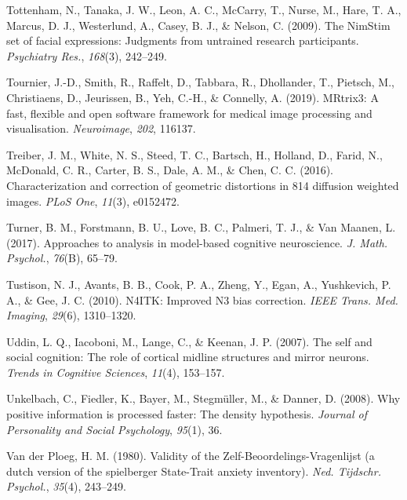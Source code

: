 \documentclass[12pt,american,a4paper,oneside,]{memoir} %
\begin{document}
\leavevmode\hypertarget{ref-Tottenham2009-vn}{}%
Tottenham, N., Tanaka, J. W., Leon, A. C., McCarry, T., Nurse, M., Hare, T. A., Marcus, D. J., Westerlund, A., Casey, B. J., \& Nelson, C. (2009). The NimStim set of facial expressions: Judgments from untrained research participants. \emph{Psychiatry Res.}, \emph{168}(3), 242--249.

\leavevmode\hypertarget{ref-Tournier2019-hh}{}%
Tournier, J.-D., Smith, R., Raffelt, D., Tabbara, R., Dhollander, T., Pietsch, M., Christiaens, D., Jeurissen, B., Yeh, C.-H., \& Connelly, A. (2019). MRtrix3: A fast, flexible and open software framework for medical image processing and visualisation. \emph{Neuroimage}, \emph{202}, 116137.

\leavevmode\hypertarget{ref-Treiber2016-mc}{}%
Treiber, J. M., White, N. S., Steed, T. C., Bartsch, H., Holland, D., Farid, N., McDonald, C. R., Carter, B. S., Dale, A. M., \& Chen, C. C. (2016). Characterization and correction of geometric distortions in 814 diffusion weighted images. \emph{PLoS One}, \emph{11}(3), e0152472.

\leavevmode\hypertarget{ref-Turner2017-fi}{}%
Turner, B. M., Forstmann, B. U., Love, B. C., Palmeri, T. J., \& Van Maanen, L. (2017). Approaches to analysis in model-based cognitive neuroscience. \emph{J. Math. Psychol.}, \emph{76}(B), 65--79.

\leavevmode\hypertarget{ref-Tustison2010-tk}{}%
Tustison, N. J., Avants, B. B., Cook, P. A., Zheng, Y., Egan, A., Yushkevich, P. A., \& Gee, J. C. (2010). N4ITK: Improved N3 bias correction. \emph{IEEE Trans. Med. Imaging}, \emph{29}(6), 1310--1320.

\leavevmode\hypertarget{ref-uddin2007self}{}%
Uddin, L. Q., Iacoboni, M., Lange, C., \& Keenan, J. P. (2007). The self and social cognition: The role of cortical midline structures and mirror neurons. \emph{Trends in Cognitive Sciences}, \emph{11}(4), 153--157.

\leavevmode\hypertarget{ref-unkelbach2008positive}{}%
Unkelbach, C., Fiedler, K., Bayer, M., Stegmüller, M., \& Danner, D. (2008). Why positive information is processed faster: The density hypothesis. \emph{Journal of Personality and Social Psychology}, \emph{95}(1), 36.

\leavevmode\hypertarget{ref-Van_der_Ploeg1980-tq}{}%
Van der Ploeg, H. M. (1980). Validity of the Zelf-Beoordelings-Vragenlijst (a dutch version of the spielberger State-Trait anxiety inventory). \emph{Ned. Tijdschr. Psychol.}, \emph{35}(4), 243--249.
\end{document}

